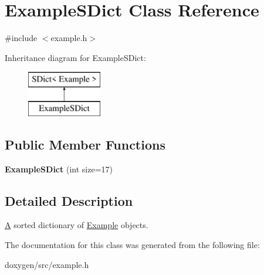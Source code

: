 \hypertarget{class_example_s_dict}{}\section{Example\+S\+Dict Class Reference}
\label{class_example_s_dict}


{\ttfamily \#include $<$example.\+h$>$}

Inheritance diagram for Example\+S\+Dict\+:\begin{figure}[H]
\begin{center}
\leavevmode
\includegraphics[height=2.000000cm]{class_example_s_dict}
\end{center}
\end{figure}
\subsection*{Public Member Functions}
\begin{DoxyCompactItemize}
\item 
\mbox{\label{class_example_s_dict_a62c61c71df0f8d3e66fb94b268e69db4}} 
{\bfseries Example\+S\+Dict} (int size=17)
\end{DoxyCompactItemize}


\subsection{Detailed Description}
\mbox{\hyperlink{class_a}{A}} sorted dictionary of \mbox{\hyperlink{struct_example}{Example}} objects. 

The documentation for this class was generated from the following file\+:\begin{DoxyCompactItemize}
\item 
doxygen/src/example.\+h\end{DoxyCompactItemize}
